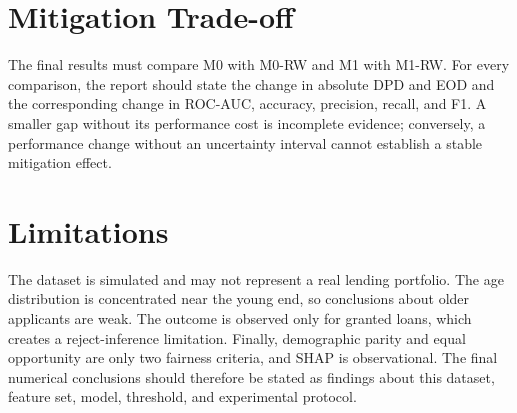 \section{Mitigation Trade-off}

The final results must compare M0 with M0-RW and M1 with M1-RW. For every
comparison, the report should state the change in absolute DPD and EOD and
the corresponding change in ROC-AUC, accuracy, precision, recall, and F1.
A smaller gap without its performance cost is incomplete evidence; conversely,
a performance change without an uncertainty interval cannot establish a stable
mitigation effect.

\section{Limitations}

The dataset is simulated and may not represent a real lending portfolio. The
age distribution is concentrated near the young end, so conclusions about
older applicants are weak. The outcome is observed only for granted loans,
which creates a reject-inference limitation. Finally, demographic parity and
equal opportunity are only two fairness criteria, and SHAP is observational.
The final numerical conclusions should therefore be stated as findings about
this dataset, feature set, model, threshold, and experimental protocol.
